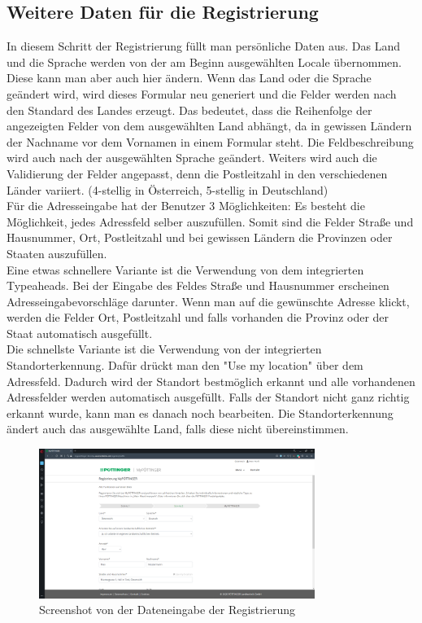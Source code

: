 \subsection{Weitere Daten für die Registrierung}

In diesem Schritt der Registrierung füllt man persönliche Daten aus. Das Land und die Sprache werden von der am Beginn ausgewählten Locale übernommen. Diese kann man aber auch hier ändern. Wenn das Land oder die Sprache geändert wird, wird dieses Formular neu generiert und die Felder werden nach den Standard des Landes erzeugt. Das bedeutet, dass die Reihenfolge der angezeigten Felder von dem ausgewählten Land abhängt, da in gewissen Ländern der Nachname vor dem Vornamen in einem Formular steht. Die Feldbeschreibung wird auch nach der ausgewählten Sprache geändert. Weiters wird auch die Validierung der Felder angepasst, denn die Postleitzahl in den verschiedenen Länder variiert. (4-stellig in Österreich, 5-stellig in Deutschland)\\

Für die Adresseingabe hat der Benutzer 3 Möglichkeiten:
Es besteht die Möglichkeit, jedes Adressfeld selber auszufüllen. Somit sind die Felder Straße und Hausnummer, Ort, Postleitzahl und bei gewissen Ländern die Provinzen oder Staaten auszufüllen.\\

Eine etwas schnellere Variante ist die Verwendung von dem integrierten Typeaheads. Bei der Eingabe des Feldes Straße und Hausnummer erscheinen Adresseingabevorschläge darunter. Wenn man auf die gewünschte Adresse klickt, werden die Felder Ort, Postleitzahl und falls vorhanden die Provinz oder der Staat automatisch ausgefüllt.\\

Die schnellste Variante ist die Verwendung von der integrierten Standorterkennung. Dafür drückt man den "Use my location" über dem Adressfeld. Dadurch wird der Standort bestmöglich erkannt und alle vorhandenen Adressfelder werden automatisch ausgefüllt. Falls der Standort nicht ganz richtig erkannt wurde, kann man es danach noch bearbeiten. Die Standorterkennung ändert auch das ausgewählte Land, falls diese nicht übereinstimmen.

\begin{figure}[H]
	\centerline{
		\includegraphics[width=0.8\textwidth]{./grafiken/erm_register_2.png}
	}
	\vskip0pt
	\caption{Screenshot von der Dateneingabe der Registrierung} \label{fig:register2}
\end{figure}

